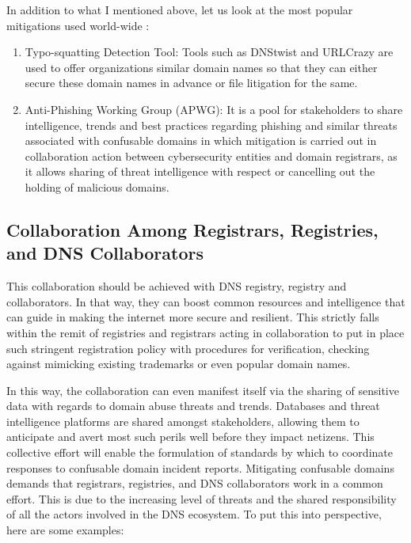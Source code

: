 In addition to what I mentioned above, let us look at the most popular mitigations used world-wide :

\begin{enumerate}
 
  \item Typo-squatting Detection Tool: Tools such as DNStwist and URLCrazy are used to offer organizations similar domain names so that they can either secure these domain names in advance or file litigation for the same.
  \item Anti-Phishing Working Group (APWG): It is a pool for stakeholders to share intelligence, trends and best practices regarding phishing and similar threats associated with confusable domains in which mitigation is carried out in collaboration action between cybersecurity entities and domain registrars, as it allows sharing of threat intelligence with respect or cancelling out the holding of malicious domains.
\end{enumerate}

\subsection{Collaboration Among Registrars, Registries, and DNS Collaborators}

This collaboration should be achieved with DNS registry, registry and collaborators. In that way, they can boost common resources and intelligence that can guide in making the internet more secure and resilient. This strictly falls within the remit of registries and registrars acting in collaboration to put in place such stringent registration policy with procedures for verification, checking against mimicking existing trademarks or even popular domain names.

In this way, the collaboration can even manifest itself via the sharing of sensitive data with regards to domain abuse threats and trends. Databases and threat intelligence platforms are shared amongst stakeholders, allowing them to anticipate and avert most such perils well before they impact netizens. This collective effort will enable the formulation of standards by which to coordinate responses to confusable domain incident reports. Mitigating confusable domains demands that registrars, registries, and DNS collaborators work in a common effort. This is due to the increasing level of threats and the shared responsibility of all the actors involved in the DNS ecosystem. \cite{Catania2022} To put this into perspective, here are some examples: 




